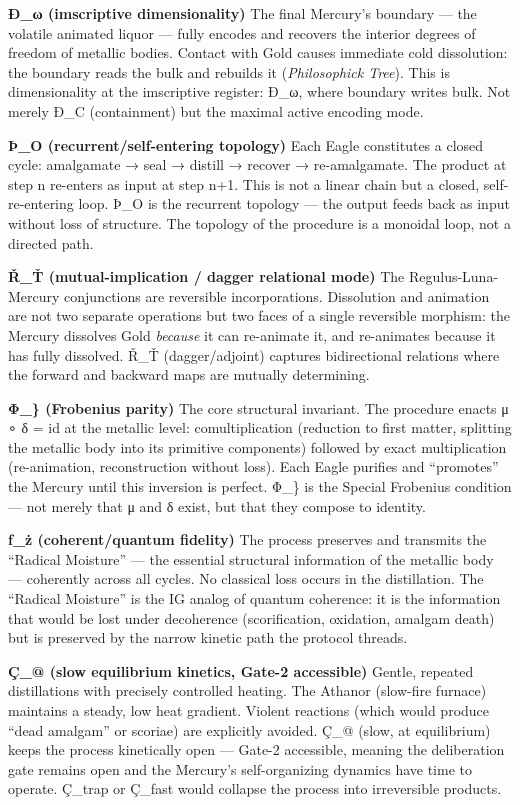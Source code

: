 \documentclass[
  11pt,
  a4paper,
]{article}
\begin{document}
\textbf{Ð\_ω (imscriptive dimensionality)} The final Mercury's boundary
--- the volatile animated liquor --- fully encodes and recovers the
interior degrees of freedom of metallic bodies. Contact with Gold causes
immediate cold dissolution: the boundary reads the bulk and rebuilds it
(\emph{Philosophick Tree}). This is dimensionality at the imscriptive
register: Ð\_ω, where boundary writes bulk. Not merely Ð\_C
(containment) but the maximal active encoding mode.

\textbf{Þ\_O (recurrent/self-entering topology)} Each Eagle constitutes
a closed cycle: amalgamate → seal → distill → recover → re-amalgamate.
The product at step n re-enters as input at step n+1. This is not a
linear chain but a closed, self-re-entering loop. Þ\_O is the recurrent
topology --- the output feeds back as input without loss of structure.
The topology of the procedure is a monoidal loop, not a directed path.

\textbf{Ř\_Ť (mutual-implication / dagger relational mode)} The
Regulus-Luna-Mercury conjunctions are reversible incorporations.
Dissolution and animation are not two separate operations but two faces
of a single reversible morphism: the Mercury dissolves Gold
\emph{because} it can re-animate it, and re-animates because it has
fully dissolved. Ř\_Ť (dagger/adjoint) captures bidirectional relations
where the forward and backward maps are mutually determining.

\textbf{Φ\_\} (Frobenius parity)} The core structural invariant. The
procedure enacts μ ∘ δ = id at the metallic level: comultiplication
(reduction to first matter, splitting the metallic body into its
primitive components) followed by exact multiplication (re-animation,
reconstruction without loss). Each Eagle purifies and ``promotes'' the
Mercury until this inversion is perfect. Φ\_\} is the Special Frobenius
condition --- not merely that μ and δ exist, but that they compose to
identity.

\textbf{ƒ\_ż (coherent/quantum fidelity)} The process preserves and
transmits the ``Radical Moisture'' --- the essential structural
information of the metallic body --- coherently across all cycles. No
classical loss occurs in the distillation. The ``Radical Moisture'' is
the IG analog of quantum coherence: it is the information that would be
lost under decoherence (scorification, oxidation, amalgam death) but is
preserved by the narrow kinetic path the protocol threads.

\textbf{Ç\_@ (slow equilibrium kinetics, Gate-2 accessible)} Gentle,
repeated distillations with precisely controlled heating. The Athanor
(slow-fire furnace) maintains a steady, low heat gradient. Violent
reactions (which would produce ``dead amalgam'' or scoriae) are
explicitly avoided. Ç\_@ (slow, at equilibrium) keeps the process
kinetically open --- Gate-2 accessible, meaning the deliberation gate
remains open and the Mercury's self-organizing dynamics have time to
operate. Ç\_trap or Ç\_fast would collapse the process into irreversible
products.
\end{document}
